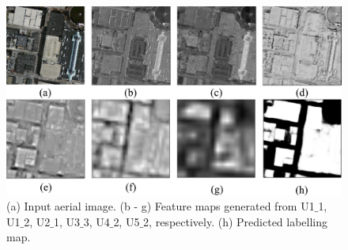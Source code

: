\documentclass[runningheads]{llncs}
\begin{document}
\begin{figure}
\centering
\includegraphics[width=120mm]{featuremaps}
\caption{(a) Input aerial image. (b - g) Feature maps generated from U1$\_$1, U1$\_$2, U2$\_$1, U3$\_$3, U4$\_$2, U5$\_$2, respectively. (h) Predicted labelling map.}
\label{fig:featuremapsofHF-FCN}
\end{figure}

%   
%   
   
\end{document}
